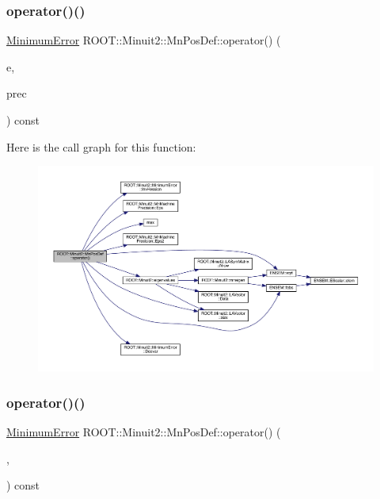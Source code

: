 \subsubsection{\texorpdfstring{operator()()}{operator()()}\hspace{0.1cm}{\footnotesize\ttfamily [5/6]}}
{\footnotesize\ttfamily \mbox{\hyperlink{classROOT_1_1Minuit2_1_1MinimumError}{Minimum\+Error}} R\+O\+O\+T\+::\+Minuit2\+::\+Mn\+Pos\+Def\+::operator() (\begin{DoxyParamCaption}\item[{const \mbox{\hyperlink{classROOT_1_1Minuit2_1_1MinimumError}{Minimum\+Error}} \&}]{e,  }\item[{const \mbox{\hyperlink{classROOT_1_1Minuit2_1_1MnMachinePrecision}{Mn\+Machine\+Precision}} \&}]{prec }\end{DoxyParamCaption}) const}

Here is the call graph for this function\+:
\nopagebreak
\begin{figure}[H]
\begin{center}
\leavevmode
\includegraphics[width=350pt]{d0/dab/classROOT_1_1Minuit2_1_1MnPosDef_ace62b61f17edf0c57ef824003b99b9ec_cgraph}
\end{center}
\end{figure}
\mbox{\label{classROOT_1_1Minuit2_1_1MnPosDef_ace62b61f17edf0c57ef824003b99b9ec}} 
\subsubsection{\texorpdfstring{operator()()}{operator()()}\hspace{0.1cm}{\footnotesize\ttfamily [6/6]}}
{\footnotesize\ttfamily \mbox{\hyperlink{classROOT_1_1Minuit2_1_1MinimumError}{Minimum\+Error}} R\+O\+O\+T\+::\+Minuit2\+::\+Mn\+Pos\+Def\+::operator() (\begin{DoxyParamCaption}\item[{const \mbox{\hyperlink{classROOT_1_1Minuit2_1_1MinimumError}{Minimum\+Error}} \&}]{,  }\item[{const \mbox{\hyperlink{classROOT_1_1Minuit2_1_1MnMachinePrecision}{Mn\+Machine\+Precision}} \&}]{ }\end{DoxyParamCaption}) const}



